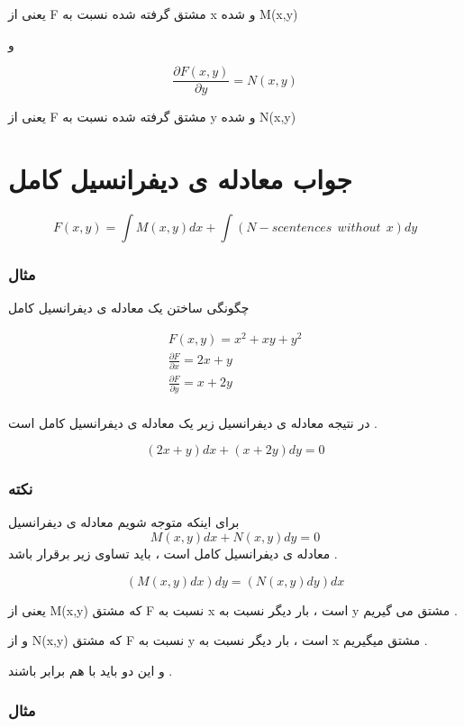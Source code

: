 \documentclass[12pt]{book}
\begin{document}
یعنی از F مشتق گرفته شده نسبت به x و شده M(x,y)

و

$$
\frac{\partial{F(x,y)}}{\partial{y}} = N(x,y)
$$

یعنی از F مشتق گرفته شده نسبت به y و شده N(x,y)


\section{جواب معادله ی دیفرانسیل کامل}

\begin{tcolorbox}
$$
F(x,y) = \int{M(x,y)dx} + \int{(N - scentences \:\: without \:\: x) dy}
$$
\end{tcolorbox}

\subsubsection{مثال}

چگونگی ساختن یک معادله ی دیفرانسیل کامل 

\begin{align*}
F(x,y) = x^{2} + xy + y^{2} \\
\frac{\partial{F}}{\partial{x}} = 2x + y \\
\frac{\partial{F}}{\partial{y}} = x + 2y \\
\end{align*}

در نتیجه معادله ی دیفرانسیل زیر یک معادله ی دیفرانسیل کامل است .

$$
(2x + y)dx + (x + 2y)dy = 0
$$


\subsubsection{نکته}

برای اینکه متوجه شویم معادله ی دیفرانسیل
$$
M(x,y)dx + N(x,y)dy = 0
$$
معادله ی دیفرانسیل کامل است ، باید تساوی زیر برقرار باشد .

$$
( M(x,y)dx ) dy = ( N(x,y)dy ) dx
$$

یعنی از M(x,y) که مشتق F نسبت به x است ، بار دیگر نسبت به y مشتق می گیریم .

و از N(x,y) که مشتق F نسبت به y است ، بار دیگر نسبت به x مشتق میگیریم .

و این دو باید با هم برابر باشند .

\subsubsection{مثال}
\end{document}
